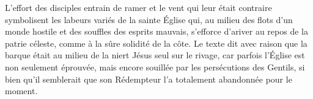 L'effort des disciples entrain de ramer et le vent qui leur était contraire symbolisent les labeurs variés de la sainte Église qui, au milieu des flots d’un monde hostile et des souffles des esprits mauvais, s’efforce d’ariver au repos de la patrie céleste, comme à la sûre solidité de la côte. Le texte dit avec raison que la barque était au milieu de la niert Jésus seul sur le rivage, car parfois l’Église est non seulement éprouvée, mais encore souillée par les persécutions des Gentils, si bien qu’il semblerait que son Rédempteur l’a totalement abandonnée pour le moment.
